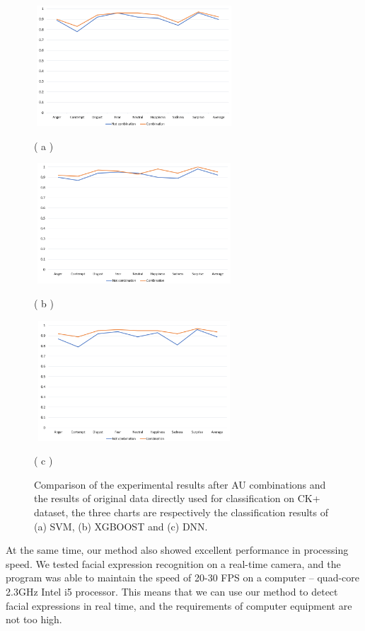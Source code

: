 \documentclass[10pt, conference, compsocconf]{IEEEtran}
\begin{document}
\begin{figure}
	\centering
	\begin{minipage}[c]{0.5\textwidth}
		\centering	
		\includegraphics[height=4.5cm,width=7.5cm]{SVM}
	\end{minipage}
	( a )
	\begin{minipage}[c]{0.5\textwidth}
		\centering
		\includegraphics[height=4.5cm,width=7.5cm]{XGBOOST}	
	\end{minipage}
	( b )
	\begin{minipage}[c]{0.5\textwidth}
		\centering
		\includegraphics[height=4.5cm,width=7.5cm]{DNN}	
	\end{minipage}
	( c )
	\caption{Comparison of the experimental results after AU combinations and the results of original data directly used for classification on CK+ dataset, the three charts are respectively the classification results of (a) SVM, (b) XGBOOST and (c) DNN.}
\end{figure}

At the same time, our method also showed excellent performance in processing speed. We tested facial expression recognition on a real-time camera, and the program was able to maintain the speed of 20-30 FPS on a computer -- quad-core 2.3GHz Intel i5 processor. This means that we can use our method to detect facial expressions in real time, and the requirements of computer equipment are not too high.
\end{document}
